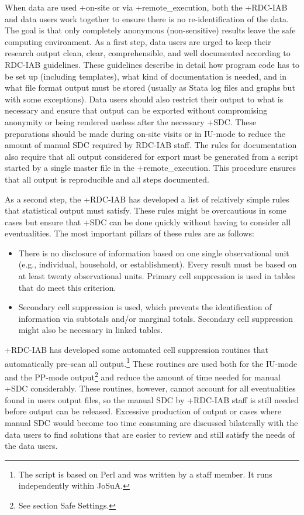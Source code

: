 \documentclass[
]{WileySix}
\providecommand{\tightlist}{%
  \setlength{\itemsep}{0pt}\setlength{\parskip}{0pt}}
\begin{document}
When data are used +on-site\textbar{} or via +remote\_execution\textbar, both the +RDC-IAB\textbar{} and data users work together to ensure there is no re-identification of the data. The goal is that only completely anonymous (non-sensitive) results leave the safe computing environment. As a first step, data users are urged to keep their research output clean, clear, comprehensible, and well documented according to RDC-IAB guidelines. These guidelines describe in detail how program code has to be set up (including templates), what kind of documentation is needed, and in what file format output must be stored (usually as Stata log files and graphs but with some exceptions). Data users should also restrict their output to what is necessary and ensure that output can be exported without compromising anonymity or being rendered useless after the necessary +SDC\textbar. These preparations should be made during on-site visits or in IU-mode to reduce the amount of manual SDC required by RDC-IAB staff. The rules for documentation also require that all output considered for export must be generated from a script started by a single master file in the +remote\_execution\textbar. This procedure ensures that all output is reproducible and all steps documented.

As a second step, the +RDC-IAB\textbar{} has developed a list of relatively simple rules that statistical output must satisfy. These rules might be overcautious in some cases but ensure that +SDC\textbar{} can be done quickly without having to consider all eventualities. The most important pillars of these rules are as follows:

\begin{itemize}
\tightlist
\item
  There is no disclosure of information based on one single observational unit (e.g., individual, household, or establishment). Every result must be based on at least twenty observational units. Primary cell suppression is used in tables that do meet this criterion.
\item
  Secondary cell suppression is used, which prevents the identification of information via subtotals and/or marginal totals. Secondary cell suppression might also be necessary in linked tables.
\end{itemize}

+RDC-IAB\textbar{} has developed some automated cell suppression routines that automatically pre-scan all output.\footnote{The script is based on Perl and was written by a staff member. It runs independently within JoSuA.} These routines are used both for the IU-mode and the PP-mode output\footnote{See section Safe Settings.} and reduce the amount of time needed for manual +SDC\textbar{} considerably. These routines, however, cannot account for all eventualities found in users output files, so the manual SDC by +RDC-IAB\textbar{} staff is still needed before output can be released. Excessive production of output or cases where manual SDC would become too time consuming are discussed bilaterally with the data users to find solutions that are easier to review and still satisfy the needs of the data users.
\end{document}
